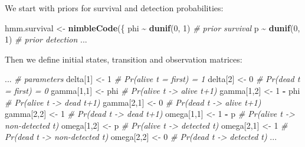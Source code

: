\documentclass[
  12pt,
]{krantz}
\newenvironment{Shaded}{\begin{snugshade}}{\end{snugshade}}
\newcommand{\CommentTok}[1]{\textcolor[rgb]{0.56,0.35,0.01}{\textit{#1}}}
\newcommand{\DecValTok}[1]{\textcolor[rgb]{0.00,0.00,0.81}{#1}}
\newcommand{\FunctionTok}[1]{\textcolor[rgb]{0.13,0.29,0.53}{\textbf{#1}}}
\newcommand{\NormalTok}[1]{#1}
\newcommand{\OtherTok}[1]{\textcolor[rgb]{0.56,0.35,0.01}{#1}}
\newcommand{\SpecialCharTok}[1]{\textcolor[rgb]{0.81,0.36,0.00}{\textbf{#1}}}
\begin{document}
We start with priors for survival and detection probabilities:

\begin{Shaded}
\begin{Highlighting}[]
\NormalTok{hmm.survival }\OtherTok{\textless{}{-}} \FunctionTok{nimbleCode}\NormalTok{(\{}
\NormalTok{  phi }\SpecialCharTok{\textasciitilde{}} \FunctionTok{dunif}\NormalTok{(}\DecValTok{0}\NormalTok{, }\DecValTok{1}\NormalTok{) }\CommentTok{\# prior survival}
\NormalTok{  p }\SpecialCharTok{\textasciitilde{}} \FunctionTok{dunif}\NormalTok{(}\DecValTok{0}\NormalTok{, }\DecValTok{1}\NormalTok{) }\CommentTok{\# prior detection}
\NormalTok{...}
\end{Highlighting}
\end{Shaded}

Then we define initial states, transition and observation matrices:

\begin{Shaded}
\begin{Highlighting}[]
\NormalTok{...}
  \CommentTok{\# parameters}
\NormalTok{  delta[}\DecValTok{1}\NormalTok{] }\OtherTok{\textless{}{-}} \DecValTok{1}          \CommentTok{\# Pr(alive t = first) = 1}
\NormalTok{  delta[}\DecValTok{2}\NormalTok{] }\OtherTok{\textless{}{-}} \DecValTok{0}          \CommentTok{\# Pr(dead t = first) = 0}
\NormalTok{  gamma[}\DecValTok{1}\NormalTok{,}\DecValTok{1}\NormalTok{] }\OtherTok{\textless{}{-}}\NormalTok{ phi      }\CommentTok{\# Pr(alive t {-}\textgreater{} alive t+1)}
\NormalTok{  gamma[}\DecValTok{1}\NormalTok{,}\DecValTok{2}\NormalTok{] }\OtherTok{\textless{}{-}} \DecValTok{1} \SpecialCharTok{{-}}\NormalTok{ phi  }\CommentTok{\# Pr(alive t {-}\textgreater{} dead t+1)}
\NormalTok{  gamma[}\DecValTok{2}\NormalTok{,}\DecValTok{1}\NormalTok{] }\OtherTok{\textless{}{-}} \DecValTok{0}        \CommentTok{\# Pr(dead t {-}\textgreater{} alive t+1)}
\NormalTok{  gamma[}\DecValTok{2}\NormalTok{,}\DecValTok{2}\NormalTok{] }\OtherTok{\textless{}{-}} \DecValTok{1}        \CommentTok{\# Pr(dead t {-}\textgreater{} dead t+1)}
\NormalTok{  omega[}\DecValTok{1}\NormalTok{,}\DecValTok{1}\NormalTok{] }\OtherTok{\textless{}{-}} \DecValTok{1} \SpecialCharTok{{-}}\NormalTok{ p    }\CommentTok{\# Pr(alive t {-}\textgreater{} non{-}detected t)}
\NormalTok{  omega[}\DecValTok{1}\NormalTok{,}\DecValTok{2}\NormalTok{] }\OtherTok{\textless{}{-}}\NormalTok{ p        }\CommentTok{\# Pr(alive t {-}\textgreater{} detected t)}
\NormalTok{  omega[}\DecValTok{2}\NormalTok{,}\DecValTok{1}\NormalTok{] }\OtherTok{\textless{}{-}} \DecValTok{1}        \CommentTok{\# Pr(dead t {-}\textgreater{} non{-}detected t)}
\NormalTok{  omega[}\DecValTok{2}\NormalTok{,}\DecValTok{2}\NormalTok{] }\OtherTok{\textless{}{-}} \DecValTok{0}        \CommentTok{\# Pr(dead t {-}\textgreater{} detected t)}
\NormalTok{...}
\end{Highlighting}
\end{Shaded}
\end{document}
